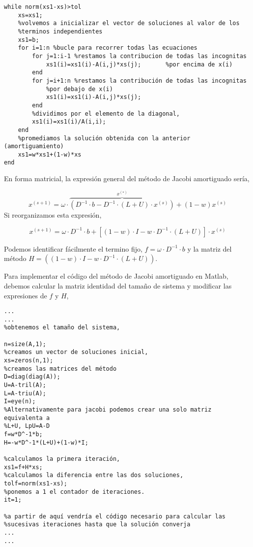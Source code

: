 \begin{verbatim}
while norm(xs1-xs)>tol
 	xs=xs1;
    %volvemos a inicializar el vector de soluciones al valor de los
    %terminos independientes
    xs1=b; 
    for i=1:n %bucle para recorrer todas las ecuaciones
        for j=1:i-1 %restamos la contribucion de todas las incognitas
            xs1(i)=xs1(i)-A(i,j)*xs(j);       %por encima de x(i)
        end
        for j=i+1:n %restamos la contribución de todas las incognitas
            %por debajo de x(i)
            xs1(i)=xs1(i)-A(i,j)*xs(j);
        end
        %dividimos por el elemento de la diagonal,
        xs1(i)=xs1(i)/A(i,i);
    end
    %promediamos la solución obtenida con la anterior (amortiguamiento)
    xs1=w*xs1+(1-w)*xs
end
\end{verbatim}

En forma matricial, la expresión general del método de Jacobi amortiguado sería,

\begin{equation*}
x^{(s+1)}=\omega\cdot\overbrace{\left(D^{-1}\cdot b- D^{-1}\cdot\left(L+U\right)\cdot x^{(s)}\right)}^{x^{(*)}}+(1-w)x^{(s)}
\end{equation*}
Si reorganizamos esta expresión,

\begin{equation*}
x^{(s+1)}=\omega\cdot D^{-1}\cdot b+ \left[(1-w)\cdot I - w\cdot  D^{-1}\cdot  \left(L+U \right)\right]\cdot x^{(s)}
\end{equation*}

Podemos identificar fácilmente el termino fijo, $f=\omega\cdot D^{-1}\cdot b$ y la matriz del método $H=\left((1-w)\cdot I - w\cdot  D^{-1}\cdot  \left(L+U \right)\right)$.

Para implementar el código del método de Jacobi amortiguado en Matlab, debemos calcular la matriz identidad del tamaño de sistema y modificar las expresiones de $f$ y $H$,

\begin{verbatim}
...
...
%obtenemos el tamaño del sistema,

n=size(A,1);
%creamos un vector de soluciones inicial,
xs=zeros(n,1);
%creamos las matrices del método
D=diag(diag(A));
U=A-tril(A);
L=A-triu(A);
I=eye(n);
%Alternativamente para jacobi podemos crear una solo matriz equivalenta a
%L+U, LpU=A-D
f=w*D^-1*b;
H=-w*D^-1*(L+U)+(1-w)*I;

%calculamos la primera iteración,
xs1=f+H*xs;
%calculamos la diferencia entre las dos soluciones,
tolf=norm(xs1-xs);
%ponemos a 1 el contador de iteraciones.
it=1;

%a partir de aquí vendría el código necesario para calcular las
%sucesivas iteraciones hasta que la solución converja
...
...
\end{verbatim}


